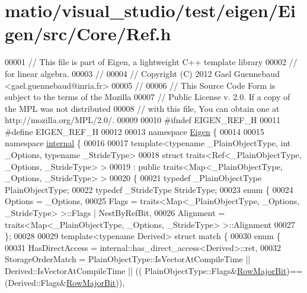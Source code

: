 \hypertarget{matio_2visual__studio_2test_2eigen_2_eigen_2src_2_core_2_ref_8h_source}{}\section{matio/visual\+\_\+studio/test/eigen/\+Eigen/src/\+Core/\+Ref.h}
\label{matio_2visual__studio_2test_2eigen_2_eigen_2src_2_core_2_ref_8h_source}

\begin{DoxyCode}
00001 \textcolor{comment}{// This file is part of Eigen, a lightweight C++ template library}
00002 \textcolor{comment}{// for linear algebra.}
00003 \textcolor{comment}{//}
00004 \textcolor{comment}{// Copyright (C) 2012 Gael Guennebaud <gael.guennebaud@inria.fr>}
00005 \textcolor{comment}{//}
00006 \textcolor{comment}{// This Source Code Form is subject to the terms of the Mozilla}
00007 \textcolor{comment}{// Public License v. 2.0. If a copy of the MPL was not distributed}
00008 \textcolor{comment}{// with this file, You can obtain one at http://mozilla.org/MPL/2.0/.}
00009 
00010 \textcolor{preprocessor}{#ifndef EIGEN\_REF\_H}
00011 \textcolor{preprocessor}{#define EIGEN\_REF\_H}
00012 
00013 \textcolor{keyword}{namespace }\hyperlink{namespace_eigen}{Eigen} \{ 
00014 
00015 \textcolor{keyword}{namespace }\hyperlink{namespaceinternal}{internal} \{
00016 
00017 \textcolor{keyword}{template}<\textcolor{keyword}{typename} \_PlainObjectType, \textcolor{keywordtype}{int} \_Options, \textcolor{keyword}{typename} \_Str\textcolor{keywordtype}{id}eType>
00018 \textcolor{keyword}{struct }traits<Ref<\_PlainObjectType, \_Options, \_StrideType> >
00019   : \textcolor{keyword}{public} traits<Map<\_PlainObjectType, \_Options, \_StrideType> >
00020 \{
00021   \textcolor{keyword}{typedef} \_PlainObjectType PlainObjectType;
00022   \textcolor{keyword}{typedef} \_StrideType StrideType;
00023   \textcolor{keyword}{enum} \{
00024     Options = \_Options,
00025     Flags = traits<Map<\_PlainObjectType, \_Options, \_StrideType> >::Flags | NestByRefBit,
00026     Alignment = traits<Map<\_PlainObjectType, \_Options, \_StrideType> >::Alignment
00027   \};
00028 
00029   \textcolor{keyword}{template}<\textcolor{keyword}{typename} Derived> \textcolor{keyword}{struct }match \{
00030     \textcolor{keyword}{enum} \{
00031       HasDirectAccess = internal::has\_direct\_access<Derived>::ret,
00032       StorageOrderMatch = PlainObjectType::IsVectorAtCompileTime || Derived::IsVectorAtCompileTime || ((
      PlainObjectType::Flags&\hyperlink{group__flags_gae4f56c2a60bbe4bd2e44c5b19cbe8762}{RowMajorBit})==(Derived::Flags&\hyperlink{group__flags_gae4f56c2a60bbe4bd2e44c5b19cbe8762}{RowMajorBit})),

\end{DoxyCode}
